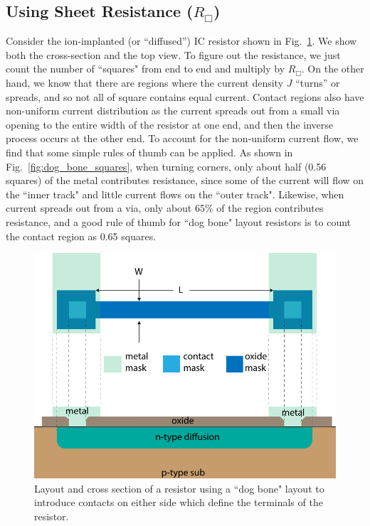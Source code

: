 \subsection{Using Sheet Resistance ($R_\Box$)}
Consider the ion-implanted (or “diffused”) IC resistor shown in Fig.~\ref{fig:diff_resistor_top}.  We show both the cross-section and the top view.  To figure out the resistance, we just count the number of ``squares" from end to end and multiply by $R_\Box$.  On the other hand, we know that there are regions where the current density $J$ ``turns” or spreads, and so not all of square contains equal current.   Contact regions also have non-uniform current distribution as the current spreads out from a small via opening to the entire width of the resistor at one end, and then the inverse process occurs at the other end.  To account for the non-uniform current flow, we find that some simple rules of thumb can be applied.  As shown in Fig.~\ref{fig:dog_bone_squares}, when turning corners, only about half (0.56 squares) of the metal contributes resistance, since some of the current will flow on the ``inner track" and little current flows on the ``outer track".  Likewise, when current spreads out from a via, only about 65\% of the region contributes resistance, and a good rule of thumb for ``dog bone" layout resistors is to count the contact region as 0.65 squares.
\begin{figure}[tb]
\begin{center}
\includegraphics[width=.7\columnwidth]{diff_resistor_top}
\end{center}
\caption{Layout and cross section of a resistor using a ``dog bone" layout to introduce contacts on either side which define the terminals of the resistor.}
\label{fig:diff_resistor_top}
\end{figure}
